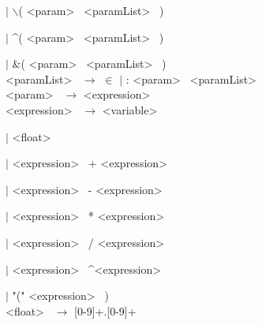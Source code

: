 \hspace{2cm} $|$ $\backslash$(  \textless param\textgreater~ \textless paramList\textgreater~ ) 

\hspace{2cm} $|$ \textasciicircum (  \textless param\textgreater~ \textless paramList\textgreater~ ) 

\hspace{2cm} $|$ $\&$(  \textless param\textgreater~ \textless paramList\textgreater~ ) \\



\noindent
\textless paramList\textgreater~ $\rightarrow$ $\in$ $|$ : \textless param\textgreater~ \textless paramList\textgreater~ \\



\noindent
\textless param\textgreater~ $\rightarrow$ \textless expression\textgreater~ \\



\noindent
\textless expression\textgreater~ $\rightarrow$  \textless variable\textgreater~

\hspace{2cm} $|$ \textless float\textgreater~

\hspace{2cm} $|$ \textless expression\textgreater~ + \textless expression\textgreater~

\hspace{2cm} $|$ \textless expression\textgreater~ - \textless expression\textgreater~

\hspace{2cm} $|$ \textless expression\textgreater~ * \textless expression\textgreater~

\hspace{2cm} $|$ \textless expression\textgreater~ / \textless expression\textgreater~

\hspace{2cm} $|$ \textless expression\textgreater~ \textasciicircum \textless expression\textgreater~

\hspace{2cm} $|$ "(" \textless expression\textgreater~ ) \\



\noindent
\textless float\textgreater~ $\rightarrow$ [0-9]+.[0-9]+ \\



